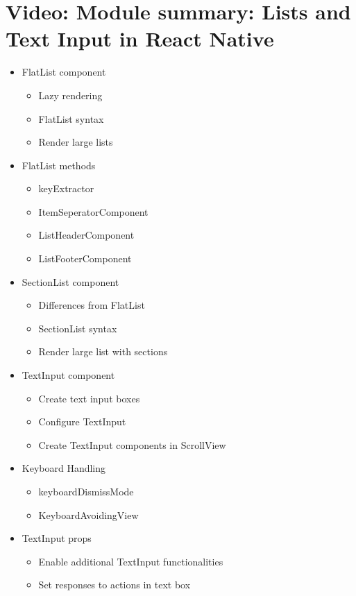 \section{Video: Module summary: Lists and Text Input in React Native}
\begin{itemize}
    \item FlatList component
    \begin{itemize}
        \item Lazy rendering
        \item FlatList syntax
        \item Render large lists
    \end{itemize}

    \item FlatList methods
    \begin{itemize}
        \item keyExtractor
        \item ItemSeperatorComponent
        \item ListHeaderComponent
        \item ListFooterComponent
    \end{itemize}

    \item SectionList component
    \begin{itemize}
        \item Differences from FlatList
        \item SectionList syntax
        \item Render large list with sections
    \end{itemize}

    \item TextInput component
    \begin{itemize}
        \item Create text input boxes
        \item Configure TextInput
        \item Create TextInput components in ScrollView
    \end{itemize}

    \item Keyboard Handling
    \begin{itemize}
        \item keyboardDismissMode
        \item KeyboardAvoidingView
    \end{itemize}

    \item TextInput props
    \begin{itemize}
        \item Enable additional TextInput functionalities
        \item Set responses to actions in text box
    \end{itemize}
\end{itemize}

